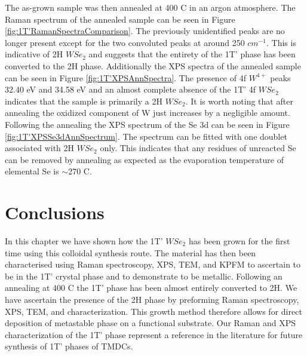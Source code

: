The as-grown sample was then annealed at 400 {\degree}C in an argon atmosphere. The Raman spectrum of the annealed sample can be seen in Figure \ref{fig:1T'RamanSpectraComparison}. The previously unidentified peaks are no longer present except for the two convoluted peaks at around 250 $cm^{-1}$. This is indicative of 2H $WSe_2$ and suggests that the entirety of the 1T' phase has been converted to the 2H phase. Additionally the XPS spectra of the annealed sample can be seen in Figure \ref{fig:1T'XPSAnnSpectra}. The presence of 4f $W^{4+}$ peaks 32.40 eV and 34.58 eV and an almost complete absence of the 1T' 4f $WSe_2$ indicates that the sample is primarily a 2H $WSe_2$. It is worth noting that after annealing the oxidized component of W just increases by a negligible amount. Following the annealing the XPS spectrum of the Se 3d can be seen in Figure \ref{fig:1T'XPSSe3dAnnSpectrum}. The spectrum can be fitted with one doublet associated with 2H $WSe_2$ only. This indicates that any residues of unreacted Se can be removed by annealing as expected as the evaporation temperature of elemental Se is $\sim$270 {\degree}C. 

\section{Conclusions}

In this chapter we have shown how the 1T' $WSe_2$ has been grown for the first time using this colloidal synthesis route. The material has then been characterised using Raman spectroscopy, XPS, TEM, and KPFM to ascertain to be in the 1T’ crystal phase and to demonstrate  to be metallic. Following an annealing at 400 {\degree}C the 1T' phase has been almost entirely converted to 2H. We have ascertain the presence of the 2H phase by preforming Raman spectroscopy, XPS, TEM, and characterization. This growth method therefore allows for direct deposition of metastable phase on a functional substrate. Our Raman and XPS characterization of the 1T’ phase represent a reference in the literature for future synthesis of 1T’ phases of TMDCs.